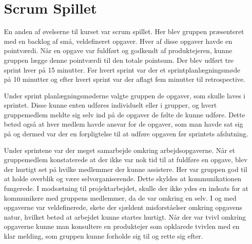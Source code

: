 
\section{Scrum Spillet}
En anden af øvelserne til kurset var scrum spillet. Her blev gruppen præsenteret med en backlog af små, veldefineret opgaver. Hver af disse opgaver havde en pointværdi. Når en opgave var fuldført og godkendt af produktejeren, kunne gruppen lægge denne pointværdi til den totale pointsum. Der blev udført tre sprint hver på 15 minutter. Før hvert sprint var der et sprintplanlægningsmøde på 10 minutter og efter hvert sprint var der aflagt fem minutter til retrospective. \newline

Under sprint planlægningsmøderne valgte gruppen de opgaver, som skulle laves i sprintet. Disse kunne enten udføres individuelt eller i grupper, og hvert gruppemedlem meldte sig selv ind på de opgaver de følte de kunne udføre. Dette betød også at hver medlem havde ansvar for de opgaver, som man havde sat sig på og dermed var der en forpligtelse til at udføre opgaven før sprintets afslutning. \newline

Under sprintene var der meget samarbejde omkring arbejdsopgaverne. Når et gruppemedlem konstaterede at der ikke var nok tid til at fuldføre en opgave, blev der hurtigt set på hvilke medlemmer der kunne assistere. Her var gruppen god til at holde overblik og være selvorganiserende. Dette skyldes at kommunikationen fungerede. I modsætning til projektarbejdet, skulle der ikke ydes en indsats for at kommunikere med gruppens medlemmer, da de var omkring en selv. 
I og med opgaverne var veldefinerede, skete der sjældent misforståelser omkring opgavens natur, hvilket betød at arbejdet kunne startes hurtigt. Når der var tvivl omkring opgaverne kunne man konsultere en produktejer som opklarede tvivlen med en klar melding, som gruppen kunne forholde sig til og rette sig efter.  \newline


